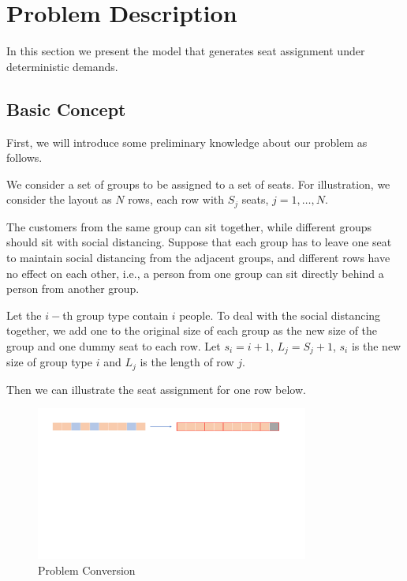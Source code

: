 \section{Problem Description}
In this section we present the model that generates seat assignment under deterministic demands.

\subsection{Basic Concept}

First, we will introduce some preliminary knowledge about our problem as follows.

We consider a set of groups to be assigned to a set of seats. For illustration, we consider the layout as $N$ rows, each row with $S_{j}$ seats, $j = 1, \ldots, N$. 


The customers from the same group can sit together, while different groups should sit with social distancing. Suppose that each group has to leave one seat to maintain social distancing from the adjacent groups, and different rows have no effect on each other, i.e., a person from one group can sit directly behind a person from another group.

Let the $i-$th group type contain $i$ people. To deal with the social distancing together, we add one to the original size of each group as the new size of the group and one dummy seat to each row. Let $s_{i} = i + 1$, $L_{j} = S_{j} +1$, $s_{i}$ is the new size of group type $i$ and $L_{j}$ is the length of row $j$.

Then we can illustrate the seat assignment for one row below. 

\begin{figure}[ht]
    \centering
    \includegraphics[width = 0.8\textwidth]{./Figures/dummy_seat.pdf}
    \caption{Problem Conversion}
\end{figure}

